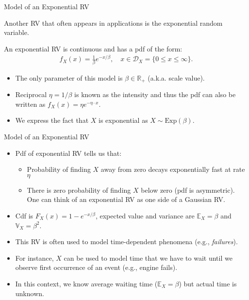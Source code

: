 \documentclass[9pt]{beamer}
\begin{document}
%
\begin{frame}{Model of an Exponential RV}

Another RV that often appears in applications is the exponential random variable.  

\begin{block}{}
An exponential RV is continuous and has a pdf of the form:
\begin{align*}
f_X(x)=\frac{1}{\beta}e^{-x/\beta},\quad x\in \mathcal{D}_X=\{0\leq x\leq \infty\}.
\end{align*}
\end{block}
\begin{itemize}
\setlength{\itemsep}{10pt}
\item The only parameter of this model is $\beta \in \mathbb{R}_+$ (a.k.a. scale value). 
\item Reciprocal $\eta=1/\beta$ is known as the intensity and thus the pdf can also be written as $f_X(x)=\eta e^{-\eta\cdot x}$. 
\item We express the fact that $X$ is exponential as $X\sim \textrm{Exp}(\beta)$.
\end{itemize}

\end{frame}

%
\begin{frame}{Model of an Exponential RV}

\begin{itemize}
\setlength{\itemsep}{10pt}
\item Pdf of exponential RV tells us that:

\begin{itemize} 
\setlength{\itemsep}{10pt}
\item Probability of finding $X$ away from zero decays exponentially fast at rate $\eta$
\item There is zero probability of finding $X$ below zero (pdf is asymmetric). One can think of an exponential RV as one side of a Gaussian RV. 
\end{itemize}
\item Cdf is $F_X(x)=1-e^{-x/\beta}$, expected value and variance are $\mathbb{E}_X=\beta$ and $\mathbb{V}_X=\beta^2$.
\item This RV is often used to model time-dependent phenomena (e.g., {\em failures}). 
\item For instance, $X$ can be used to model time that we have to wait until we observe first occurrence of an event (e.g., engine fails). 
\item In this context, we know average waiting time ($\mathbb{E}_X=\beta$) but actual time is unknown. 
\end{itemize}

\end{frame}
\end{document}
